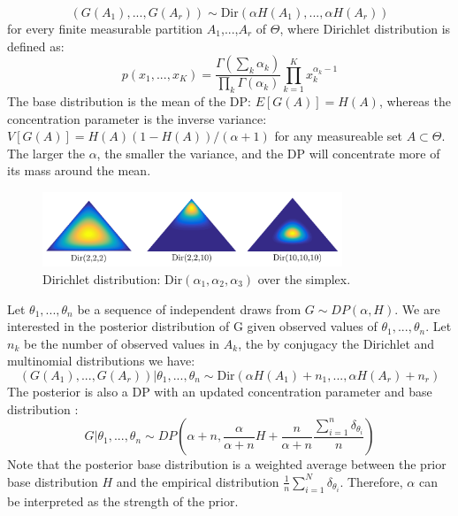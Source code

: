 \begin{equation}
    (G(A_1),...,G(A_r)) \sim \mathrm{Dir}(\alpha H(A_1),...,\alpha H(A_r))
\end{equation}
for every finite measurable partition $A_1$,...,$A_r$ of $\Theta$, where Dirichlet distribution is defined as:
\begin{equation}
    p(x_1,...,x_K) = \frac{\Gamma(\sum_k \alpha_k)}{\prod_k \Gamma(\alpha_k)}\prod_{k=1}^{K}x_{k}^{\alpha_k-1}
\end{equation}
The base distribution is the mean of the DP: $E[G(A)] = H(A)$, whereas the concentration parameter is the inverse variance: $V[G(A)] = H(A)(1-H(A))/(\alpha+1)$ for any measureable set $A\subset \Theta$. The larger the $\alpha$, the smaller the variance, and the DP will concentrate more of its mass around the mean.
\begin{figure}[tbhp]
    \centering
    \includegraphics[width=0.8\textwidth, trim={10 10 10 10}]{figures/dir_merged.png}
    \caption{Dirichlet distribution: $\mathrm{Dir}(\alpha_1,\alpha_2,\alpha_3)$ over the simplex.}
    \label{fig:dir_merged}
\end{figure}
Let $\theta_1,...,\theta_n$ be a sequence of independent draws from $G\sim DP(\alpha,H)$. We are interested in the posterior distribution of G given observed values of $\theta_1,...,\theta_n$. Let $n_k$ be the number of observed values in $A_k$, the by conjugacy the Dirichlet and multinomial distributions we have:
\begin{equation}
    (G(A_1),...,G(A_r))|\theta_1,...,\theta_n \sim \mathrm{Dir}(\alpha H(A_1)+n_1,...,\alpha H(A_r)+n_r)
\end{equation}
The posterior is also a DP with an updated concentration parameter and base distribution \cite{Teh2010a}:
\begin{equation}\label{equ:dp_posterior}
    G|\theta_1,...,\theta_n \sim DP(\alpha+n, \frac{\alpha}{\alpha+n}H + \frac{n}{\alpha+n}\frac{\sum_{i=1}^{n}\delta_{\theta_i}}{n})
\end{equation}
Note that the posterior base distribution is a weighted average between the prior base distribution $H$ and the empirical distribution $\frac{1}{n}\sum_{i=1}^{N}\delta_{\theta_i}$. Therefore, $\alpha$ can be interpreted as the strength of the prior. 

